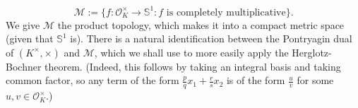 \documentclass[11pt]{amsart}
\theoremstyle{definition}
\newtheorem{definition}[lemma]{Definition}
\renewcommand{\S}{\mathbb{S}}
\newcommand{\Z}{{\mathbb Z}}
\newcommand{\U}{{\mathbb U}}
\newcommand{\AK}[1]{{\color{ForestGreen}{{#1}}}}
\begin{document}
\[
\mathcal{M}:= \{ f: \mathcal{O}_K^{\times} \to \S^1 : f \text{ is completely multiplicative}\}.
\]
We give $\mathcal{M}$ the product topology, which makes it into a compact metric space (given that $\S^1$ is). There is a natural identification between the Pontryagin dual of $(K^{\times},\times)$ and $\mathcal{M}$, which we shall use to more easily apply the Herglotz-Bochner theorem. (Indeed, this follows by taking an integral basis and taking common factor, so any term of the form $\frac{p}{q}x_1+\frac{r}{s}x_2$ is of the form $\frac{u}{v}$ for some $u, v \in \mathcal{O}_K^{\times}.$) 
\end{document}
